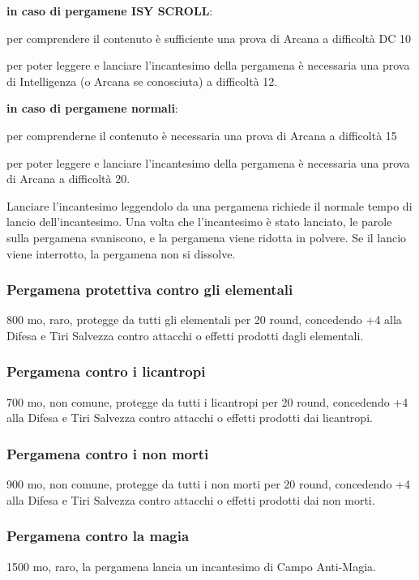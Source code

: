 \begin{multicols}{2}
\textbf{in caso di pergamene ISY SCROLL}:

per comprendere il contenuto è sufficiente una prova di Arcana a difficoltà DC 10

per poter leggere e lanciare l'incantesimo della pergamena è necessaria una prova di Intelligenza (o Arcana se conosciuta) a difficoltà 12.

\textbf{in caso di pergamene normali}:

per comprenderne il contenuto è necessaria una prova di Arcana a difficoltà 15

per poter leggere e lanciare l'incantesimo della pergamena è necessaria una prova di Arcana a difficoltà 20.

Lanciare l'incantesimo leggendolo da una pergamena richiede il normale tempo di lancio dell'incantesimo. Una volta che l'incantesimo è stato lanciato, le parole sulla pergamena svaniscono, e la pergamena viene ridotta in polvere. Se il lancio viene interrotto, la pergamena non si dissolve.

\subsubsection*{Pergamena protettiva contro gli elementali}
800 mo, raro, protegge da tutti gli elementali per 20 round, concedendo +4 alla Difesa e Tiri Salvezza contro attacchi o effetti prodotti dagli elementali.

\subsubsection*{Pergamena contro i licantropi}
700 mo, non comune, protegge da tutti i licantropi per 20 round, concedendo +4 alla Difesa e Tiri Salvezza contro attacchi o effetti prodotti dai licantropi.

\subsubsection*{Pergamena contro i non morti}
900 mo, non comune, protegge da tutti i non morti per 20 round, concedendo +4 alla Difesa e Tiri Salvezza contro attacchi o effetti prodotti dai non morti.

\subsubsection*{Pergamena contro la magia}
1500 mo, raro, la pergamena lancia un incantesimo di Campo Anti-Magia.


\end{multicols}

